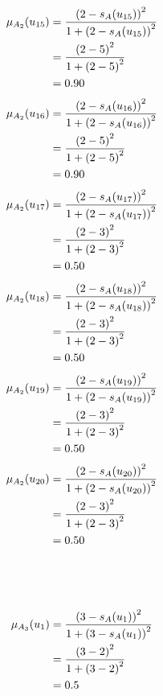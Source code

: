 \documentclass[a4paper]{book}
\begin{document}
				\begin{align}
					\mu_{A_2}(u_{15}) &= \frac{\left(2-s_A(u_{15})\right)^2}{1 + \left(2-s_A(u_{15})\right)^2}\\
					&= \frac{\left(2-5\right)^2}{1 + \left(2-5\right)^2} \notag \\
					&= 0.90 \notag
				\end{align}
				\begin{align}
					\mu_{A_2}(u_{16}) &= \frac{\left(2-s_A(u_{16})\right)^2}{1 + \left(2-s_A(u_{16})\right)^2}\\
					&= \frac{\left(2-5\right)^2}{1 + \left(2-5\right)^2} \notag \\
					&= 0.90 \notag
				\end{align}
				\begin{align}
					\mu_{A_2}(u_{17}) &= \frac{\left(2-s_A(u_{17})\right)^2}{1 + \left(2-s_A(u_{17})\right)^2}\\
					&= \frac{\left(2-3\right)^2}{1 + \left(2-3\right)^2} \notag \\
					&= 0.50 \notag
				\end{align}
				\begin{align}
					\mu_{A_2}(u_{18}) &= \frac{\left(2-s_A(u_{18})\right)^2}{1 + \left(2-s_A(u_{18})\right)^2}\\
					&= \frac{\left(2-3\right)^2}{1 + \left(2-3\right)^2} \notag \\
					&= 0.50 \notag
				\end{align}
				\begin{align}
					\mu_{A_2}(u_{19}) &= \frac{\left(2-s_A(u_{19})\right)^2}{1 + \left(2-s_A(u_{19})\right)^2}\\
					&= \frac{\left(2-3\right)^2}{1 + \left(2-3\right)^2} \notag \\
					&= 0.50 \notag
				\end{align}
				\begin{align}
					\mu_{A_2}(u_{20}) &= \frac{\left(2-s_A(u_{20})\right)^2}{1 + \left(2-s_A(u_{20})\right)^2}\\
					&= \frac{\left(2-3\right)^2}{1 + \left(2-3\right)^2} \notag \\
					&= 0.50 \notag
				\end{align}
				\\
				\\
				\\
				\begin{align}
					\mu_{A_3}(u_1) &= \frac{\left(3-s_A(u_1)\right)^2}{1 + \left(3-s_A(u_1)\right)^2}\\
					&= \frac{\left(3-2\right)^2}{1 + \left(3-2\right)^2} \notag \\
					&= 0.5 \notag
				\end{align}
\end{document}
